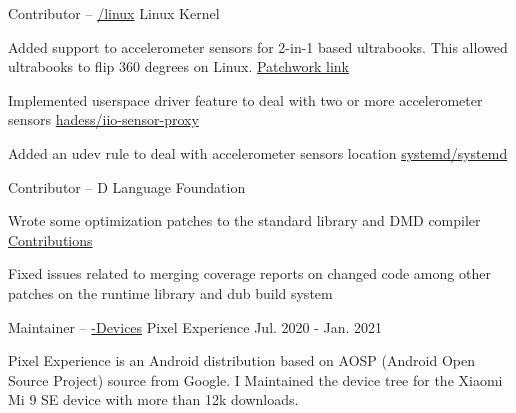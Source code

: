 \begin{cventries}
  \cventry
    {Contributor -- \href{https://github.com/torvalds/linux/}{\faGithubSquare\acvHeaderIconSep\@torvalds/linux}} %
    {Linux Kernel} %
    {} %
    {} %
    {
      \begin{cvitems} %
        \item {Added support to accelerometer sensors for 2-in-1 based ultrabooks. This allowed ultrabooks to flip 360 degrees on Linux. \hfill \href{https://patchwork.kernel.org/patch/10882031/}{Patchwork link}}
        \item {Implemented userspace driver feature to deal with two or more accelerometer sensors \hfill \href{https://github.com/hadess/iio-sensor-proxy/pull/262}{hadess/iio-sensor-proxy\acvHeaderIconSep\@\faGithubSquare}}
        \item{Added an udev rule to deal with accelerometer sensors location \hfill \href{https://github.com/systemd/systemd/pull/12322/}{systemd/systemd\acvHeaderIconSep\@\faGithubSquare}}
      \end{cvitems}
    }

  \cventry
    {Contributor --
    \href{https://github.com/dlang}{\faGithubSquare\acvHeaderIconSep\@dlang}} %
    {D Language Foundation} %
    {} %
    {} %
    {
      \begin{cvitems} %
        \item {Wrote some optimization patches to the standard library and DMD compiler\hfill
        \href{https://github.com/pulls?q=is\%3Apr+author\%3Aljmf00+is\%3Aclosed+org\%3Adlang+}{Contributions \acvHeaderIconSep\@\faGithubSquare}}
        \item {Fixed issues related to merging coverage reports on changed code among other patches on the runtime library and dub build system}
      \end{cvitems}
    }

  \cventry
    {Maintainer --
    \href{https://github.com/PixelExperience-Devices}{\faGithubSquare\acvHeaderIconSep\@PixelExperience-Devices}} %
    {Pixel Experience} %
    {} %
    {Jul. 2020 - Jan. 2021} %
    {
      \begin{cvitems} %
        \item {Pixel Experience is an Android distribution based on AOSP (Android Open Source Project) source from Google. I Maintained the device tree for the Xiaomi Mi 9 SE device with more than 12k downloads.}
      \end{cvitems}
    }


\end{cventries}
